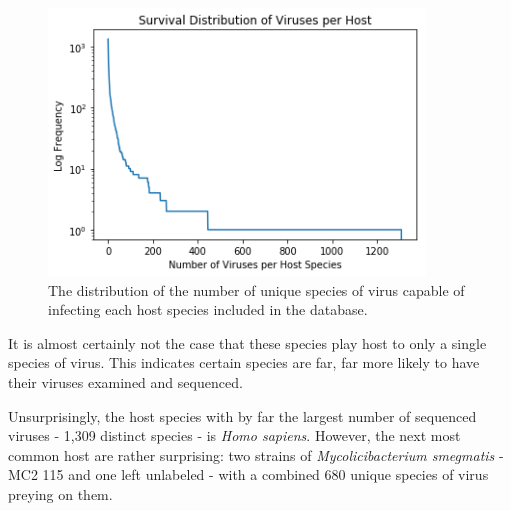 \documentclass[12pt]{article}
\begin{document}
    \begin{figure}[H]
        \begin{center}
            \includegraphics[width=100mm]{viruses_per_host_figure.png}
            \caption{The distribution of the number of unique species of virus
            capable of infecting each host species included in the database.}
            \label {viruses_per_host_figure}
        \end{center}
    \end{figure}

    It is almost certainly not the case that these species play host to only a
    single species of virus. This indicates certain species are far, far more likely
    to have their viruses examined and sequenced.

    Unsurprisingly, the host species with by far the largest number of
    sequenced viruses - 1,309 distinct species - is \emph{Homo sapiens}. However,
    the next most common host are rather surprising: two strains of 
    \emph{Mycolicibacterium smegmatis} - MC2 115 and one left unlabeled - with a
    combined 680 unique species of virus preying on them.
\end{document}
